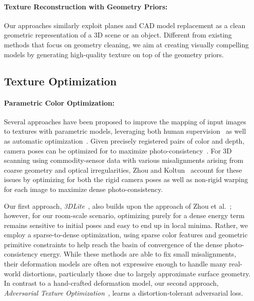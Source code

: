 \paragraph*{Texture Reconstruction with Geometry Priors:} Our approaches similarly exploit planes and CAD model replacement as a clean geometric representation of a 3D scene or an object. Different from existing methods that focus on geometry cleaning, we aim at creating visually compelling models by generating high-quality texture on top of the geometry priors.

\subsection{Texture Optimization}
\paragraph*{Parametric Color Optimization:}
Several approaches have been proposed to improve the mapping of input images to textures with parametric models,
leveraging both human supervision~\cite{franken2005minimizing,ofek1997multiresolution,neugebauer1999texturing,rocchini1999multiple,stamos20003d,pighin2006synthesizing,xu2019deep} as well as automatic optimization~\cite{bernardini2001high,pulli2000surface}. 
Given precisely registered pairs of color and depth, camera poses can be optimized for to maximize photo-consistency~\cite{johnson1999registration,pulli2000surface,pulli2005projective,bernardini2001high}. For 3D scanning using commodity-sensor data with various misalignments arising from coarse geometry and optical irregularities, Zhou and Koltun~\cite{zhou2014color} account for these issues by optimizing for both the rigid camera poses as well as non-rigid warping for each image to maximize dense photo-consistency.

Our first approach, \emph{3DLite}~\cite{huang20173dlite}, also builds upon the approach of Zhou et al.~\cite{zhou2014color}; however, for our room-scale scenario, optimizing purely for a dense energy term remains sensitive to initial poses and easy to end up in local minima. 
Rather, we employ a sparse-to-dense optimization, using sparse color features and geometric primitive constraints to help reach the basin of convergence of the dense photo-consistency energy.
While these methods are able to fix small misalignments, their deformation models are often not expressive enough to handle many real-world distortions, particularly those due to largely approximate surface geometry. 
In contrast to a hand-crafted deformation model, our second approach, \emph{Adversarial Texture Optimization}~\cite{huang2020adversarial}, learns a distortion-tolerant adversarial loss.

